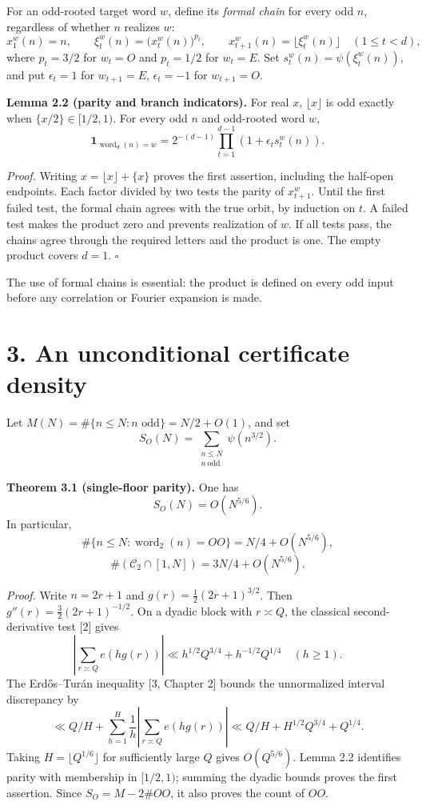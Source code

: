 \documentclass[11pt,a4paper]{article}
\begin{document}
For an odd-rooted target word \(w\), define its \emph{formal chain} for
every odd \(n\), regardless of whether \(n\) realizes \(w\): \[
x_1^w(n)=n,\qquad
\xi_t^w(n)=\bigl(x_t^w(n)\bigr)^{p_t},\qquad
x_{t+1}^w(n)=\lfloor\xi_t^w(n)\rfloor\quad(1\le t<d),
\] where \(p_t=3/2\) for \(w_t=O\) and \(p_t=1/2\) for \(w_t=E\). Set
\(s_t^w(n)=\psi(\xi_t^w(n))\), and put \(\epsilon_t=1\) for
\(w_{t+1}=E\), \(\epsilon_t=-1\) for \(w_{t+1}=O\).


\textbf{Lemma 2.2 (parity and branch indicators).} For real \(x\),
\(\lfloor x\rfloor\) is odd exactly when \(\{x/2\}\in[1/2,1)\). For
every odd \(n\) and odd-rooted word \(w\), \[
\mathbf1_{\operatorname{word}_d(n)=w}
=2^{-(d-1)}\prod_{t=1}^{d-1}(1+\epsilon_t s_t^w(n)).
\tag{2.1}
\]

\emph{Proof.} Writing \(x=\lfloor x\rfloor+\{x\}\) proves the first
assertion, including the half-open endpoints. Each factor divided by two
tests the parity of \(x_{t+1}^w\). Until the first failed test, the
formal chain agrees with the true orbit, by induction on \(t\). A failed
test makes the product zero and prevents realization of \(w\). If all
tests pass, the chains agree through the required letters and the
product is one. The empty product covers \(d=1\). \(\square\)

The use of formal chains is essential: the product is defined on every
odd input before any correlation or Fourier expansion is made.

\section{3. An unconditional certificate
density}\label{an-unconditional-certificate-density}

Let \(M(N)=\#\{n\le N:n\text{ odd}\}=N/2+O(1)\), and set \[
S_O(N)=\sum_{\substack{n\le N\\n\ \mathrm{odd}}}\psi(n^{3/2}).
\]


\textbf{Theorem 3.1 (single-floor parity).} One has \[
S_O(N)=O(N^{5/6}).
\] In particular, \[
\#\{n\le N:\operatorname{word}_2(n)=OO\}
=N/4+O(N^{5/6}),
\] \[
\#(\mathcal C_2\cap[1,N])=3N/4+O(N^{5/6}).
\]

\emph{Proof.} Write \(n=2r+1\) and \(g(r)=\tfrac12(2r+1)^{3/2}\). Then
\(g''(r)=\tfrac32(2r+1)^{-1/2}\). On a dyadic block with \(r\asymp Q\),
the classical second-derivative test {[}2{]} gives \[
\left|\sum_{r\asymp Q}e(hg(r))\right|
\ll h^{1/2}Q^{3/4}+h^{-1/2}Q^{1/4}
\quad(h\ge1).
\] The Erd\H{o}s--Tur\'{a}n inequality {[}3, Chapter 2{]} bounds the
unnormalized interval discrepancy by \[
\ll Q/H+\sum_{h=1}^{H}\frac1h
\left|\sum_{r\asymp Q}e(hg(r))\right|
\ll Q/H+H^{1/2}Q^{3/4}+Q^{1/4}.
\] Taking \(H=\lfloor Q^{1/6}\rfloor\) for sufficiently large \(Q\)
gives \(O(Q^{5/6})\). Lemma 2.2 identifies parity with membership in
\([1/2,1)\); summing the dyadic bounds proves the first assertion. Since
\(S_O=M-2\#OO\), it also proves the count of \(OO\).
\end{document}
